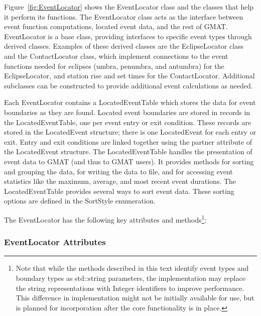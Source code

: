 \documentclass[letterpaper,10pt]{article}
\begin{document}
Figure~\ref{fig:EventLocator} shows the EventLocator class and the classes that
help it perform its functions.  The EventLocator class acts as the interface
between event function computations, located event data, and the rest of GMAT. 
EventLocator is a base class, providing interfaces to specific event types
through derived classes.  Examples of these derived classes are the
EclipseLocator class and the ContactLocator class, which implement connections
to the event functions needed for eclipses (umbra, penumbra, and antumbra) for
the EclipseLocator, and station rise and set times for the ContactLocator. 
Additional subclasses can be constructed to provide additional event
calculations as needed. 

Each EventLocator contains a LocatedEventTable which stores the data for event
boundaries as they are found.  Located event boundaries are stored in records
in the LocatedEventTable, one per event entry or exit condition.  These records
are stored in the LocatedEvent structure; there is one LocatedEvent for each
entry or exit.  Entry and exit conditions are linked together using the partner
attribute of the LocatedEvent structure.  The LocatedEventTable handles the
presentation of event data to GMAT (and thus to GMAT users).  It provides
methods for sorting and grouping the data, for writing the data to file, and
for accessing event statistics like the maximum, average, and most recent event
durations.  The LocatedEventTable provides several ways to sort event data. 
These sorting options are defined in the SortStyle enumeration.

The EventLocator has the following key attributes and methods\footnote{Note
that while the methods described in this text identify event types and
boundary types as std::string parameters, the implementation may replace the
string representations with Integer identifiers to improve performance.  This
difference in implementation might not be initially available for use, but is
planned for incorporation after the core functionality is in place.}:

\subsubsection{EventLocator Attributes}
\end{document}

